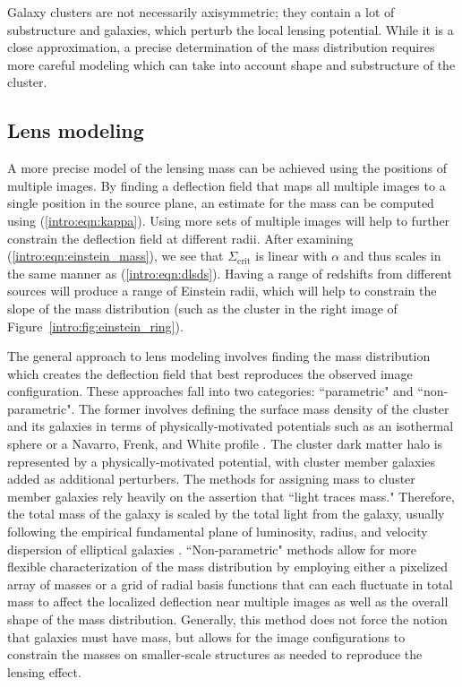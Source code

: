 Galaxy clusters are not necessarily axisymmetric; they contain a lot of substructure and galaxies, which perturb the local lensing potential. While it is a close approximation, a precise determination of the mass distribution requires more careful modeling which can take into account shape and substructure of the cluster.

\subsection{Lens modeling}

A more precise model of the lensing mass can be achieved using the positions of multiple images. By finding a deflection field that maps all multiple images to a single position in the source plane, an estimate for the mass can be computed using (\ref{intro:eqn:kappa}). Using more sets of multiple images will help to further constrain the deflection field at different radii. After examining (\ref{intro:eqn:einstein_mass}), we see that $\Sigma_\mathrm{crit}$ is linear with $\alpha$ and thus scales in the same manner as (\ref{intro:eqn:dlsds}). Having a range of redshifts from different sources will produce a range of Einstein radii, which will help to constrain the slope of the mass distribution (such as the cluster in the right image of Figure~\ref{intro:fig:einstein_ring}).

The general approach to lens modeling involves finding the mass distribution which creates the deflection field that best reproduces the observed image configuration. These approaches fall into two categories: ``parametric" and ``non-parametric". The former involves defining the surface mass density of the cluster and its galaxies in terms of physically-motivated potentials such as an isothermal sphere or a Navarro, Frenk, and White profile \citep[NFW; ][]{Navarro:1997qa}. The cluster dark matter halo is represented by a physically-motivated potential, with cluster member galaxies added as additional perturbers. The methods for assigning mass to cluster member galaxies rely heavily on the assertion that ``light traces mass." Therefore, the total mass of the galaxy is scaled by the total light from the galaxy, usually following the empirical fundamental plane of luminosity, radius, and velocity dispersion of elliptical galaxies \citep{Gudehus:1973kq}. ``Non-parametric" methods allow for more flexible characterization of the mass distribution by employing either a pixelized array of masses or a grid of radial basis functions that can each fluctuate in total mass to affect the localized deflection near multiple images as well as the overall shape of the mass distribution. Generally, this method does not force the notion that galaxies must have mass, but allows for the image configurations to constrain the masses on smaller-scale structures as needed to reproduce the lensing effect.

